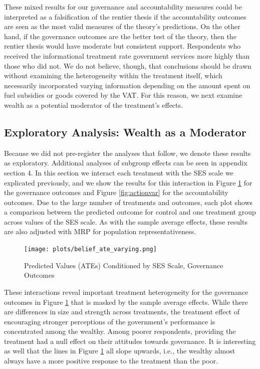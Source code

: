 \documentclass[12pt, letterpaper]{article}
\begin{document}
These mixed results for our governance and accountability measures could be interpreted as a falsification of the rentier thesis if the accountability outcomes are seen as the most valid measures of the theory's predictions. On the other hand, if the governance outcomes are the better test of the theory, then the rentier thesis would have moderate but consistent support. Respondents who received the informational treatment rate government services more highly than those who did not. We do not believe, though, that conclusions should be drawn without examining the heterogeneity within the treatment itself, which necessarily incorporated varying information depending on the amount spent on fuel subsidies or goods covered by the VAT. For this reason, we next examine wealth as a potential moderator of the treatment's effects. 

\subsection*{Exploratory Analysis: Wealth as a Moderator}

Because we did not pre-register the analyses that follow, we denote these results as exploratory. Additional analyses of subgroup effects can be seen in appendix section 4. In this section we interact each treatment with the SES scale we explicated previously, and we show the results for this interaction in Figure \ref{fig:beliefvar} for the governance outcomes and Figure \ref{fig:actionvar} for the accountability outcomes. Due to the large number of treatments and outcomes, each plot shows a comparison between the predicted outcome for control and one treatment group across values of the SES scale. As with the sample average effects, these results are also adjusted with MRP for population representativeness.

\begin{figure}
    \centering
    \texttt{[image: plots/belief\_ate\_varying.png]}
    \caption{Predicted Values (ATEs) Conditioned by SES Scale, Governance Outcomes}
    \label{fig:beliefvar}
\end{figure}

These interactions reveal important treatment heterogeneity for the governance outcomes in Figure \ref{fig:beliefvar} that is masked by the sample average effects. While there are differences in size and strength across treatments, the treatment effect of encouraging stronger perceptions of the government's performance is concentrated among the wealthy. Among poorer respondents, providing the treatment had a null effect on their attitudes towards governance. It is interesting as well that the lines in Figure \ref{fig:beliefvar} all slope upwards, i.e., the wealthy almost always have a more positive response to the treatment than the poor.
\end{document}
